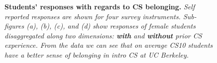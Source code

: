 \documentclass[oneside,titlepage,numbers=noenddot,headinclude,%
               footinclude=true,cleardoublepage=empty,abstractoff,BCOR=2mm,%
               paper=a4,fontsize=11pt,ngerman,american]{scrreprt}
\numberwithin{theorem}{chapter}
\numberwithin{definition}{chapter}
\numberwithin{algorithm}{chapter}
\numberwithin{figure}{chapter}
\numberwithin{table}{chapter}
\numberwithin{equation}{chapter}
\begin{document}
\begin{figure}[!htbp]
{    \label{fig:blg_3}}
\caption{\textbf{Students' responses with regards to CS belonging.} \textit{Self reported responses are shown for four survey instruments. Sub-figures (a), (b), (c), and (d) show responses of female students disaggregated along two dimensions: \textbf{with} and \textbf{without} prior CS experience. From the data we can see that on average CS10 students have a better sense of belonging in intro CS at UC Berkeley.}}
\label{blg_Dim}
\end{figure}

\end{document}
